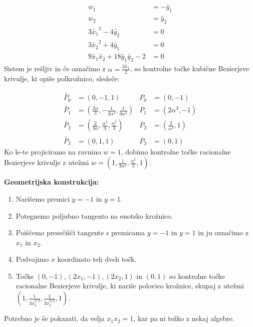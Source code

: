 \documentclass[a4paper,12pt]{article}
\begin{document}
\begin{align*}
w_{1} &= - \tilde{y_{1}} \\
w_{2} &= \tilde{y_{2}} \\
3\tilde{x_{1}}^2 - 4 \tilde{y_{2}} &= 0 \\
3 \tilde{x_{2}}^2 + 4 \tilde{y_{1}} &= 0 \\
9 \tilde{x_{1}} \tilde{x_{2}} + 18 \tilde{y_{1}} \tilde{y_{2}} - 2 &= 0
\end{align*}
Sistem je rešljiv in če označimo z  $\alpha = \frac{3\tilde{x_{1}}}{2}$, so kontrolne točke kubične Bezierjeve krivulje, ki opiše polkrožnico, sledeče:

\begin{align*}
\tilde{P_{0}} &= (0,-1,1)  & P_{0} &= (0,-1) \\
\tilde{P_{1}} &= (\frac{2\alpha}{3},-\frac{1}{3\alpha^2},\frac{1}{3\alpha^2}) & P_{1} &= (2\alpha^3, -1) \\
\tilde{P_{2}} &= (\frac{2}{3\alpha},\frac{\alpha^2}{3}, \frac{\alpha^2}{3}) & P_{2} &= (\frac{2}{\alpha^3}, 1) \\ 
\tilde{P_{3}} &= (0, 1,1) & P_{3} &= (0, 1)
\end{align*}
Ko le-te projiciramo na ravnino $w=1$, dobimo kontrolne točke racionalne Bezierjeve krivulje z utežmi $w = (1, \frac{1}{3\alpha^2}, \frac{\alpha^2}{3}, 1)$.
\medskip

\noindent
\newpage
\textbf{Geometrijska konstrukcija:}
\begin{enumerate}
\item Narišemo premici $y=-1$ in $y=1$.
\item Potegnemo poljubno tangento na enotsko krožnico.
\item Poiščemo presečišči tangente s premicama $y=-1$ in $y=1$ in ju označimo z $x_{1}$ in $x_{2}$.
\item Podvojimo $x$ koordinato teh dveh točk.
\item Točke $(0,-1), (2x_{1}, -1), (2x_{2}, 1)$ in $(0,1)$ so kontrolne točke racionalne Bezierjeve krivulje, ki nariše polovico krožnice, skupaj z utežmi $(1, \frac{1}{3x_{1}^{2/3}}, \frac{1}{3x_{2}^{2/3}}, 1)$.
\end{enumerate}

Potrebno je še pokazati, da velja $x_{1}x_{2}=1$, kar pa ni težko z nekaj algebre.
\end{document}
